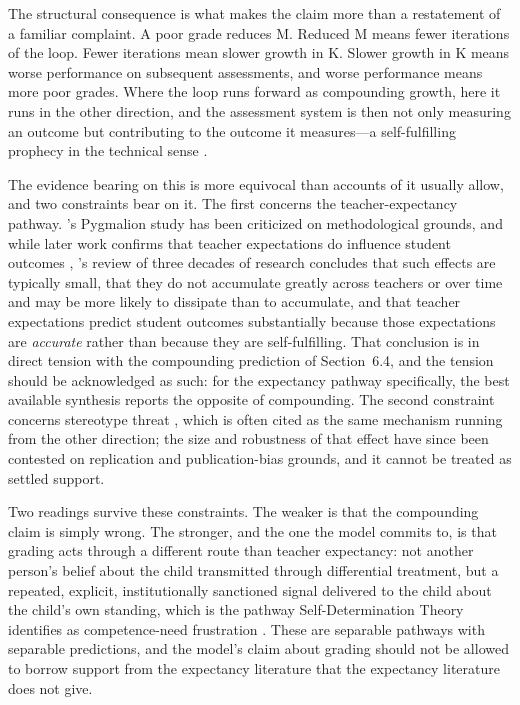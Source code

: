 \documentclass[12pt,a4paper]{article}
\begin{document}
The structural consequence is what makes the claim more than a restatement of a familiar complaint. A poor grade reduces M. Reduced M means fewer iterations of the loop. Fewer iterations mean slower growth in K. Slower growth in K means worse performance on subsequent assessments, and worse performance means more poor grades. Where the loop runs forward as compounding growth, here it runs in the other direction, and the assessment system is then not only measuring an outcome but contributing to the outcome it measures---\hspace{0pt}a self-fulfilling prophecy in the technical sense \citep{Merton1948}.

The evidence bearing on this is more equivocal than accounts of it usually allow, and two constraints bear on it. The first concerns the teacher-expectancy pathway. \citeauthor{RosenthalJacobson1968}'s \citeyearpar{RosenthalJacobson1968} Pygmalion study has been criticized on methodological grounds, and while later work confirms that teacher expectations do influence student outcomes \citep{Rosenthal2002}, \citeauthor{JussimHarber2005}'s \citeyearpar{JussimHarber2005} review of three decades of research concludes that such effects are typically small, that they do not accumulate greatly across teachers or over time and may be more likely to dissipate than to accumulate, and that teacher expectations predict student outcomes substantially because those expectations are \emph{accurate} rather than because they are self-fulfilling. That conclusion is in direct tension with the compounding prediction of Section~6.4, and the tension should be acknowledged as such: for the expectancy pathway specifically, the best available synthesis reports the opposite of compounding. The second constraint concerns stereotype threat \citep{SteeleAronson1995}, which is often cited as the same mechanism running from the other direction; the size and robustness of that effect have since been contested on replication and publication-bias grounds, and it cannot be treated as settled support.

Two readings survive these constraints. The weaker is that the compounding claim is simply wrong. The stronger, and the one the model commits to, is that grading acts through a different route than teacher expectancy: not another person's belief about the child transmitted through differential treatment, but a repeated, explicit, institutionally sanctioned signal delivered to the child about the child's own standing, which is the pathway Self-Determination Theory identifies as competence-need frustration \citep{DeciRyan2000}. These are separable pathways with separable predictions, and the model's claim about grading should not be allowed to borrow support from the expectancy literature that the expectancy literature does not give.
\end{document}
